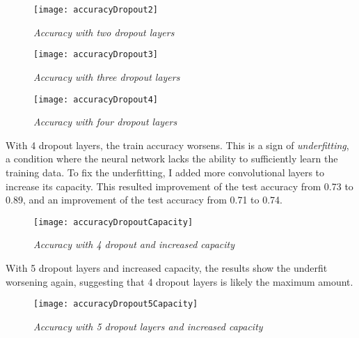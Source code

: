 \documentclass{article}
\begin{document}
\begin{figure}[H]
    \begin{center}
        \texttt{[image: accuracyDropout2]}
        \caption{\small \sl Accuracy with two dropout layers}
    \end{center}
\end{figure}

\begin{figure}[H]
    \begin{center}
        \texttt{[image: accuracyDropout3]}
        \caption{\small \sl Accuracy with three dropout layers}
    \end{center}
\end{figure}

\begin{figure}[H]
    \begin{center}
        \texttt{[image: accuracyDropout4]}
        \caption{\small \sl Accuracy with four dropout layers}
    \end{center}
\end{figure}

With 4 dropout layers, the train accuracy worsens. This is a sign of \emph{underfitting}, a condition where the neural network lacks the ability to sufficiently learn the training data.\autocite[111]{deep16} To fix the underfitting, I added more convolutional layers to increase its capacity. This resulted improvement of the test accuracy from 0.73 to 0.89, and an improvement of the test accuracy from 0.71 to 0.74.

\begin{figure}[H]
    \begin{center}
        \texttt{[image: accuracyDropoutCapacity]}
        \caption{\small \sl Accuracy with 4 dropout and increased capacity}
    \end{center}
\end{figure}

With 5 dropout layers and increased capacity, the results show the underfit worsening again, suggesting that 4 dropout layers is likely the maximum amount.

\begin{figure}[H]
    \begin{center}
        \texttt{[image: accuracyDropout5Capacity]}
        \caption{\small \sl Accuracy with 5 dropout layers and increased capacity}
    \end{center}
\end{figure}
\end{document}
